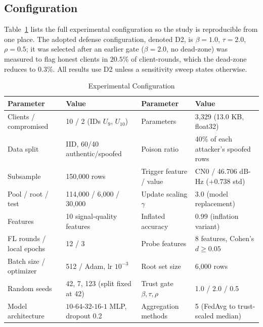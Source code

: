 \documentclass[journal]{IEEEtran}
\begin{document}
\subsection{Configuration}
Table~\ref{tab:params} lists the full experimental configuration so the study is reproducible from one place. The adopted defense configuration, denoted D2, is $\beta = 1.0$, $\tau = 2.0$, $\rho = 0.5$; it was selected after an earlier gate ($\beta=2.0$, no dead-zone) was measured to flag honest clients in $20.5\%$ of client-rounds, which the dead-zone reduces to $0.3\%$. All results use D2 unless a sensitivity sweep states otherwise.

\begin{table}[!t]
\renewcommand{\arraystretch}{1.3}
\caption{Experimental Configuration}
\label{tab:params}
\centering
\footnotesize
\begin{tabular}{@{}l l @{\hspace{3em}} l l@{}}
\toprule
\textbf{Parameter} & \textbf{Value} & \textbf{Parameter} & \textbf{Value} \\
\midrule
Clients / compromised    & 10 / 2 (IDs $U_9$, $U_{10}$)   & Parameters               & 3{,}329 (13.0 KB, float32) \\
Data split               & IID, 60/40 authentic/spoofed   & Poison ratio             & 40\% of each attacker's spoofed rows \\
Subsample                & 150{,}000 rows                 & Trigger feature / value  & CN0 / 46.706 dB-Hz ($+0.738$ std) \\
Pool / root / test       & 114{,}000 / 6{,}000 / 30{,}000 & Update scaling $\gamma$  & 3.0 (model replacement) \\
Features                 & 10 signal-quality features     & Inflated accuracy        & 0.99 (inflation variant) \\
FL rounds / local epochs & 12 / 3                         & Probe features           & 8 features, Cohen's $d \geq 0.05$ \\
Batch size / optimizer   & 512 / Adam, lr $10^{-3}$       & Root set size            & 6{,}000 rows \\
Random seeds             & 42, 7, 123 (split fixed at 42) & Trust gate $\beta,\tau,\rho$ & 1.0 / 2.0 / 0.5 \\
Model architecture       & $10\text{-}64\text{-}32\text{-}16\text{-}1$ MLP, dropout 0.2 & Aggregation methods & 5 (FedAvg to trust-scaled median) \\
\bottomrule
\end{tabular}
\end{table}
\end{document}
